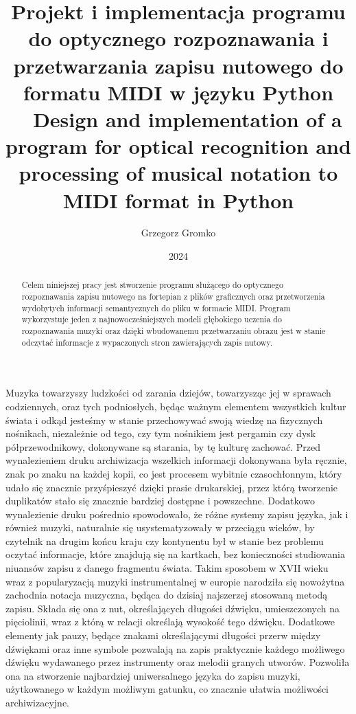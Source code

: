 \documentclass[xodstep]{wnspt}
\author      {Grzegorz Gromko}
\date        {2024}
\title{ Projekt i implementacja programu do optycznego rozpoznawania i przetwarzania zapisu nutowego do formatu MIDI w języku Python
\\{~}
Design and implementation of a program for optical recognition and processing of musical notation to MIDI format in Python}
\begin{document}
\maketitle
\onehalfspacing

\begin{abstract}
	Celem niniejszej pracy jest stworzenie programu służącego do optycznego rozpoznawania zapisu nutowego na fortepian z plików graficznych oraz przetworzenia wydobytych informacji semantycznych do pliku w formacie MIDI. Program wykorzystuje jeden z najnowocześniejszych modeli głębokiego uczenia do rozpoznawania muzyki oraz dzięki wbudowanemu przetwarzaniu obrazu jest w stanie odczytać informacje z wypaczonych stron zawierających zapis nutowy.
\end{abstract}



\introduction


Muzyka towarzyszy ludzkości od zarania dziejów, towarzysząc jej w sprawach codziennych, oraz tych podniosłych, będąc ważnym elementem wszystkich kultur świata i odkąd jesteśmy w stanie przechowywać swoją wiedzę na fizycznych nośnikach, niezależnie od tego, czy tym nośnikiem jest pergamin czy dysk półprzewodnikowy, dokonywane są starania, by tę kulturę zachować. Przed wynalezieniem druku archiwizacja wszelkich informacji dokonywana była ręcznie, znak po znaku na każdej kopii, co jest procesem wybitnie czasochłonnym, który udało się znacznie przyśpieszyć dzięki prasie drukarskiej, przez którą tworzenie duplikatów stało się znacznie bardziej dostępne i powszechne. Dodatkowo wynalezienie druku pośrednio spowodowało, że różne systemy zapisu języka, jak i również muzyki, naturalnie się usystematyzowały w przeciągu wieków, by czytelnik na drugim końcu kraju czy kontynentu był w stanie bez problemu oczytać informacje, które znajdują się na kartkach, bez konieczności studiowania niuansów zapisu z danego fragmentu świata. Takim sposobem w XVII wieku wraz z popularyzacją muzyki instrumentalnej w europie narodziła się nowożytna zachodnia notacja muzyczna, będąca do dzisiaj najszerzej stosowaną metodą zapisu. Składa się ona z nut, określających długości dźwięku, umieszczonych na pięciolinii, wraz z którą w relacji określają wysokość tego dźwięku. Dodatkowe elementy jak pauzy, będące znakami określającymi długości przerw między dźwiękami oraz inne symbole pozwalają na zapis praktycznie każdego możliwego dźwięku wydawanego przez instrumenty oraz melodii granych utworów. Pozwoliła ona na stworzenie najbardziej uniwersalnego języka do zapisu muzyki, użytkowanego w każdym możliwym gatunku, co znacznie ułatwia możliwości archiwizacyjne.
\end{document}
